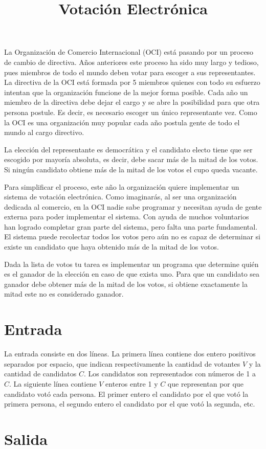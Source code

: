 \message{ !name(statement.tex)}\documentclass{article}
\title{Votación Electrónica}
\begin{document}

\maketitle

La Organización de Comercio Internacional (OCI) está pasando por un proceso de
cambio de directiva. Años anteriores este proceso ha sido muy largo y tedioso,
pues miembros de todo el mundo deben votar para escoger a sus representantes. La 
directiva de la OCI está formada por 5 miembros quienes con todo su esfuerzo
intentan que la organización funcione de la mejor forma posible. Cada año un
miembro de la directiva debe dejar el cargo y se abre la posibilidad para que
otra persona postule. Es decir, es necesario escoger un único representante vez.
Como la OCI es una organización muy popular cada año postula gente de todo el
mundo al cargo directivo.  

La elección del representante es democrática y el candidato electo tiene que ser
escogido por mayoría absoluta, es decir, debe sacar más de la mitad de los
votos. Si ningún candidato obtiene más de la mitad de los votos el cupo queda
vacante.

Para simplificar el proceso, este año la organización quiere implementar un
sistema de votación electrónica. Como imaginarás, al ser una organización
dedicada al comercio, en la OCI nadie sabe programar y necesitan ayuda de gente
externa para poder implementar el sistema. Con ayuda de muchos voluntarios han
logrado completar gran parte del sistema, pero falta una parte fundamental. El
sistema puede recolectar todos los votos pero aún no es capaz de determinar si
existe un candidato que haya obtenido más de la mitad de los votos.

Dada la lista de votos tu tarea es implementar un programa que determine quién
es el ganador de la elección en caso de que exista uno. Para que un candidato
sea ganador debe obtener más de la mitad de los votos, si obtiene exactamente la
mitad este no es considerado ganador.

\section*{Entrada}
La entrada consiste en dos líneas. La primera línea contiene dos entero
positivos separados por espacio, que indican respectivamente la cantidad de
votantes $V$ y la cantidad de candidatos $C$. Los candidatos son representados
con números de 1 a $C$. La siguiente línea contiene $V$ enteros entre 1 y $C$
que representan por que candidato votó cada persona. El primer entero el
candidato por el que votó la primera persona, el segundo entero el candidato por
el que votó la segunda, etc.

\section*{Salida}
\end{document}
